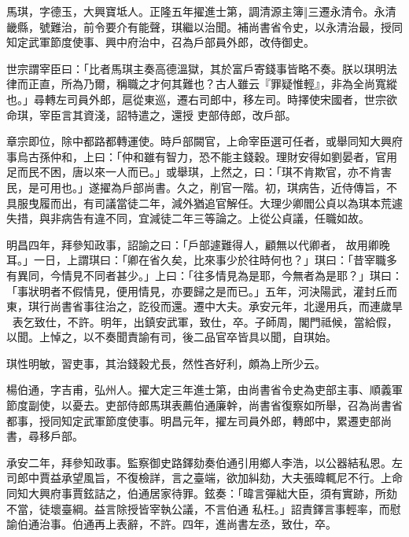 \begin{pinyinscope}
 馬琪，字德玉，大興寶坻人。正隆五年擢進士第，調清源主簿‖三遷永清令。永清畿縣，號難治，前令要介有能聲，琪繼以治聞。補尚書省令史，以永清治最，授同知定武軍節度使事、興中府治中，召為戶部員外郎，改侍御史。



 世宗謂宰臣曰：「比者馬琪主奏高德溫獄，其於富戶寄錢事皆略不奏。朕以琪明法律而正直，所為乃爾，稱職之才何其難也？古人雖云『罪疑惟輕』，非為全尚寬縱也。」尋轉左司員外郎，扈從東巡，遷右司郎中，移左司。時擇使宋國者，世宗欲命琪，宰臣言其資淺，詔特遣之，還授
 吏部侍郎，改戶部。



 章宗即位，除中都路都轉運使。時戶部闕官，上命宰臣選可任者，或舉同知大興府事烏古孫仲和，上曰：「仲和雖有智力，恐不能主錢穀。理財安得如劉晏者，官用足而民不困，唐以來一人而已。」或舉琪，上然之，曰：「琪不肯欺官，亦不肯害民，是可用也。」遂擢為戶部尚書。久之，削官一階。初，琪病告，近侍傳旨，不具服曳履而出，有司議當徒二年，減外猶追官解任。大理少卿閻公貞以為琪本荒遽失措，與非病告有違不同，宜減徒二年三等論之。上從公貞議，任職如故。



 明昌四年，拜參知政事，詔諭之曰：「戶部遽難得人，顧無以代卿者，
 故用卿晚耳。」一日，上謂琪曰：「卿在省久矣，比來事少於往時何也？」琪曰：「昔宰職多有異同，今情見不同者甚少。」上曰：「往多情見為是耶，今無者為是耶？」琪曰：「事狀明者不假情見，便用情見，亦要歸之是而已。」五年，河決陽武，灌封丘而東，琪行尚書省事往治之，訖役而還。遷中大夫。承安元年，北邊用兵，而連歲旱，表乞致仕，不許。明年，出鎮安武軍，致仕，卒。子師周，閣門祗候，當給假，以聞。上悼之，以不奏聞責諭有司，後二品官卒皆具以聞，自琪始。



 琪性明敏，習吏事，其治錢穀尤長，然性吝好利，頗為上所少云。



 楊伯通，字吉甫，弘州人。擢大定三年進士第，由尚書省令史為吏部主事、順義軍節度副使，以憂去。吏部侍郎馬琪表薦伯通廉幹，尚書省復察如所舉，召為尚書省都事，授同知定武軍節度使事。明昌元年，擢左司員外郎，轉郎中，累遷吏部尚書，尋移戶部。



 承安二年，拜參知政事。監察御史路鐸劾奏伯通引用鄉人李浩，以公器結私恩。左司郎中賈益承望風旨，不復檢詳，言之臺端，欲加糾劾，大夫張暐輒尼不行。上命同知大興府事賈鉉詰之，伯通居家待罪。鉉奏：「暐言彈絀大臣，須有實跡，所劾不當，徒壞臺綱。益言除授皆宰執公議，不言伯通
 私枉。」詔責鐸言事輕率，而慰諭伯通治事。伯通再上表辭，不許。四年，進尚書左丞，致仕，卒。




\end{pinyinscope}
